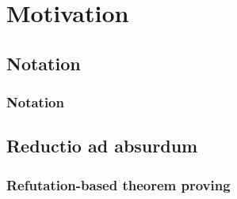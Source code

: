 
\section{Motivation}
\subsection{Notation}
\begin{frame}
	\frametitle{Notation}
	
\end{frame}

\subsection{Reductio ad absurdum}

\begin{frame}
	\frametitle{Refutation-based theorem proving}
	
\end{frame}

\begin{frame}
	
\end{frame}
	
\begin{frame}
	
\end{frame}

\begin{frame}
	
\end{frame}
	

